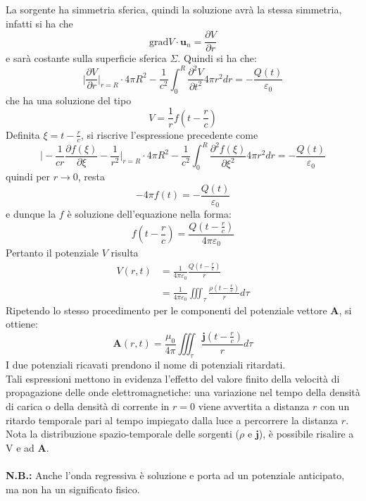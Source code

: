 \documentclass{article}
\begin{document}
La sorgente ha simmetria sferica, quindi la soluzione avrà la stessa simmetria, infatti si ha che
\begin{equation}
\text{grad}V \cdot\textbf{u}_n= \frac{\partial V}{\partial r}
\nonumber
\end{equation}
e sarà costante sulla superficie sferica $\Sigma$. Quindi si ha che:
\begin{equation}
    \Big|\frac{\partial V}{\partial r}\Big|_{r=R}\cdot 4\pi R^2-\frac{1}{c^2} \int_0 ^R \frac{\partial^2V}{\partial t^2} 4\pi r^2dr= -\frac{Q(t)}{\varepsilon_0}
    \nonumber
\end{equation}
che ha una soluzione del tipo
\begin{equation}
    V=\frac{1}{r}f\left(t-\frac{r}{c}\right)
    \nonumber
\end{equation}
Definita $\xi=t-\frac{r}{c}$, si riscrive l'espressione precedente come 
\begin{equation}
    \Big|-\frac{1}{cr}\frac{\partial f(\xi)}{\partial \xi}- \frac{1}{r^2}\Big|_{r=R}\cdot 4\pi R^2-\frac{1}{c^2} \int_0 ^R \frac{\partial^2f(\xi)}{\partial \xi^2} 4\pi r^2dr= -\frac{Q(t)}{\varepsilon_0}
    \nonumber
\end{equation}
quindi per $r\to0$, resta
\begin{equation}
    -4\pi f(t)= -\frac{Q(t)}{\varepsilon_0}
    \nonumber
\end{equation}
e dunque la $f$ è soluzione dell’equazione nella forma:
\begin{equation}
    f\left(t-\frac{r}{c}\right)=\frac{Q\left(t-\frac{r}{c}\right)}{4 \pi \varepsilon_0}
    \nonumber
\end{equation}
Pertanto il potenziale $V$ risulta
\begin{equation}
\begin{split}
    V(r,t)&=\frac{1}{4 \pi \varepsilon_0} \frac{Q\left(t-\frac{r}{c}\right)}{r} \\
    &=\frac{1}{4 \pi \varepsilon_0}\iiint_\tau \frac{\rho \left(t-\frac{r}{c}\right)}{r}d\tau
    \nonumber
\end{split}
\end{equation}
Ripetendo lo stesso procedimento per le componenti del potenziale vettore \textbf{A}, si ottiene:
\begin{equation}
    \textbf{A}(r,t)=\frac{\mu_0}{4 \pi}\iiint_\tau \frac{\textbf{j} \left(t-\frac{r}{c}\right)}{r}d\tau
    \nonumber
\end{equation}
I due potenziali ricavati prendono il nome di potenziali ritardati. \\ 
Tali espressioni mettono in evidenza l’effetto del valore finito della velocità di propagazione delle onde elettromagnetiche:
una variazione nel tempo della densità di carica o della densità di corrente in $r=0$ viene avvertita a distanza $r$ con un ritardo temporale pari al tempo impiegato dalla luce a percorrere la distanza $r$.\\
Nota la distribuzione spazio-temporale delle sorgenti ($\rho$ e $\textbf{j}$), è possibile risalire a V e ad \textbf{A}.\\
\\
\textbf{N.B.:} Anche l’onda regressiva è soluzione e porta ad un potenziale anticipato, ma non ha un significato fisico.
\end{document}
